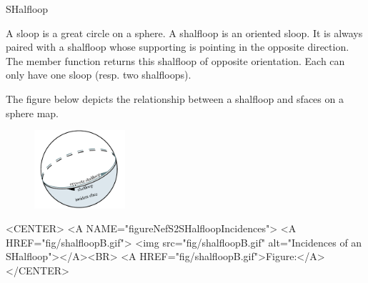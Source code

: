 
\ccRefPageBegin



\begin{ccRefClass}{SHalfloop}

\ccDefinition

A sloop is a great circle on a sphere. A shalfloop is an oriented sloop. It is always paired with a 
shalfloop whose supporting  is pointing in
the opposite direction. The  member function returns
this shalfloop of opposite orientation. Each  can only have one sloop 
(resp. two shalfloops).

The figure below
depicts the relationship between a shalfloop and sfaces on a sphere map.  


\begin{ccTexOnly}
    \begin{figure}[bht]
        \begin{center}
          \parbox{0.3\textwidth}{%
              \includegraphics[width=0.3\textwidth]{Nef_S2_ref/fig/shalfloopB}%
          }
        \end{center}
        \label{figureNefS2SHalfloopIncidences}
    \end{figure}
\end{ccTexOnly}

\begin{ccHtmlOnly}
    <CENTER>
    <A NAME="figureNefS2SHalfloopIncidences">
    <A HREF="fig/shalfloopB.gif">
        <img src="fig/shalfloopB.gif" 
             alt="Incidences of an SHalfloop"></A><BR>
    <A HREF="fig/shalfloopB.gif">Figure:</A>
    </CENTER>
\end{ccHtmlOnly}


\end{ccRefClass}

